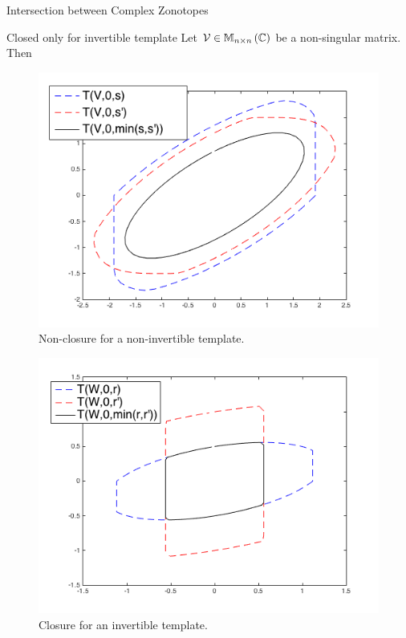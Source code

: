 \begin{frame}{Intersection between Complex Zonotopes}

\begin{block}{Closed only for invertible template}
Let ${\mathcal{V}\in\mathbb{M}_{n\times n}\left(\mathbb{C}\right)}$ be a non-singular matrix.  Then\\
%

\begin{center}
\end{center}
%
\end{block}
%
\begin{minipage}{0.48\textwidth}
\begin{figure}
  \center
  \caption{Non-closure  for a non-invertible template.}
  \includegraphics[scale=0.3]{figures/CZtopes/nonclosure.png}
\end{figure}
\end{minipage}
%
\begin{minipage}{0.48\textwidth}
\begin{figure}
  \center
  \caption{Closure for an invertible template.}
  \includegraphics[scale=0.35]{figures/CZtopes/closure.png}
\end{figure}
\end{minipage}
%
\end{frame}

